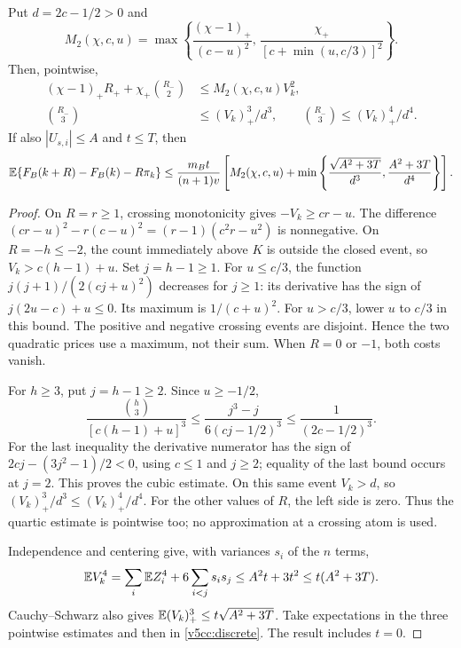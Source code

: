 \begin{lemma}
\label{v5cc:crossings}
Put $d=2c-1/2>0$ and
\[
 M_2(\chi,c,u)=\max\left\{
 \frac{(\chi-1)_+}{(c-u)^2},\,
 \frac{\chi_+}{[c+\min(u,c/3)]^2}\right\}.
\]
Then, pointwise,
\begin{align}
 (\chi-1)_+R_++\chi_+\binom{R_-}{2}
       &\le M_2(\chi,c,u)V_k^2,\\
 \binom{R_-}{3}&\le (V_k)_+^3/d^3,
 \qquad \binom{R_-}{3}\le (V_k)_+^4/d^4.
 \label{v5cc:fourth}
\end{align}
If also $|U_{s,i}|\le A$ and $t\le T$, then
\begin{equation}\label{v5cc:expected}
 \mathbb E\{F_B(k+R)-F_B(k)-R\pi_k\}
 \le\frac{m_Bt}{(n+1)v}
 \left[M_2(\chi,c,u)+
 \min\left\{\frac{\sqrt{A^2+3T}}{d^3},
                   \frac{A^2+3T}{d^4}\right\}\right].
\end{equation}
\end{lemma}
\begin{proof}
On $R=r\ge1$, crossing monotonicity gives $-V_k\ge cr-u$.
The difference
$(cr-u)^2-r(c-u)^2=(r-1)(c^2r-u^2)$ is nonnegative.
On $R=-h\le-2$, the count immediately above $K$ is outside the closed
event, so $V_k>c(h-1)+u$. Set $j=h-1\ge1$.
For $u\le c/3$, the function
$j(j+1)/(2(cj+u)^2)$ decreases for $j\ge1$: its derivative has the sign
of $j(2u-c)+u\le0$. Its maximum is $1/(c+u)^2$.
For $u>c/3$, lower $u$ to $c/3$ in this bound.
The positive and negative crossing events are disjoint. Hence the two
quadratic prices use a maximum, not their sum. When $R=0$ or $-1$,
both costs vanish.

For $h\ge3$, put $j=h-1\ge2$. Since $u\ge-1/2$,
\[
 \frac{\binom h3}{[c(h-1)+u]^3}
 \le\frac{j^3-j}{6(cj-1/2)^3}\le\frac1{(2c-1/2)^3}.
\]
For the last inequality the derivative numerator has the sign of
$2cj-(3j^2-1)/2<0$, using $c\le1$ and $j\ge2$; equality of the
last bound occurs at $j=2$. This proves the cubic estimate.
On this same event $V_k>d$, so $(V_k)_+^3/d^3\le(V_k)_+^4/d^4$.
For the other values of $R$, the left side is zero. Thus the quartic
estimate is pointwise too; no approximation at a crossing atom is used.

Independence and centering give, with variances $s_i$ of the $n$ terms,
\[
 \mathbb E V_k^4=\sum_i\mathbb E Z_i^4+6\sum_{i<j}s_is_j
 \le A^2t+3t^2\le t(A^2+3T).
\]
Cauchy--Schwarz also gives $\mathbb E(V_k)_+^3\le t\sqrt{A^2+3T}$.
Take expectations in the three pointwise estimates and then in
\eqref{v5cc:discrete}. The result includes $t=0$.
\end{proof}

